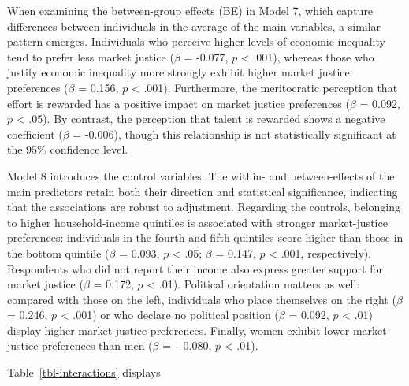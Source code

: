 \documentclass[
  12pt,
]{article}
\begin{document}
When examining the between-group effects (BE) in Model 7, which capture
differences between individuals in the average of the main variables, a
similar pattern emerges. Individuals who perceive higher levels of
economic inequality tend to prefer less market justice (\(\beta\) =
-0.077, \(p\) \textless{} .001), whereas those who justify economic
inequality more strongly exhibit higher market justice preferences
(\(\beta\) = 0.156, \(p\) \textless{} .001). Furthermore, the
meritocratic perception that effort is rewarded has a positive impact on
market justice preferences (\(\beta\) = 0.092, \(p\) \textless{} .05).
By contrast, the perception that talent is rewarded shows a negative
coefficient (\(\beta\) = -0.006), though this relationship is not
statistically significant at the 95\% confidence level.

Model 8 introduces the control variables. The within- and
between-effects of the main predictors retain both their direction and
statistical significance, indicating that the associations are robust to
adjustment. Regarding the controls, belonging to higher household-income
quintiles is associated with stronger market-justice preferences:
individuals in the fourth and fifth quintiles score higher than those in
the bottom quintile (\(\beta\) = 0.093, \(p\) \textless{} .05; \(\beta\)
= 0.147, \(p\) \textless{} .001, respectively). Respondents who did not
report their income also express greater support for market justice
(\(\beta\) = 0.172, \(p\) \textless{} .01). Political orientation
matters as well: compared with those on the left, individuals who place
themselves on the right (\(\beta\) = 0.246, \(p\) \textless{} .001) or
who declare no political position (\(\beta\) = 0.092, \(p\) \textless{}
.01) display higher market-justice preferences. Finally, women exhibit
lower market-justice preferences than men (\(\beta\) = −0.080, \(p\)
\textless{} .01).

Table~\ref{tbl-interactions} displays
\end{document}
